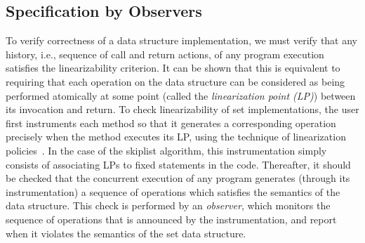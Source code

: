 




\subsection{Specification by Observers}

To verify correctness of a data structure implementation,
we must verify that any history, i.e., sequence of call and return actions,
of any program execution satisfies the linearizability criterion.
It can be shown  that this is equivalent to
requiring that each operation on the data structure can be considered as being
performed atomically at some point (called the {\em linearization point (LP)})
between its invocation and return.
To check linearizability of set implementations, the user
first instruments each method so that it generates
a corresponding operation precisely when the method executes its LP, using
the technique of linearization policies~\cite{Quy:sas16}. 
In the case of the skiplist algorithm, this instrumentation simply consists
of associating LPs to fixed statements in the code.
Thereafter, it should be checked that the concurrent execution of any
program generates (through its instrumentation) a sequence of operations which satisfies the semantics of the data structure. 
This check is performed by an {\em observer}, which 
monitors the sequence of operations that is announced by the
instrumentation, and report when it violates the semantics of the set
data structure.

